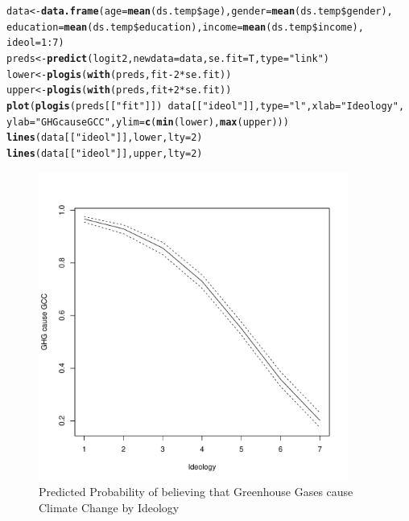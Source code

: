 \documentclass[11pt,openany]{book}\usepackage[]{graphicx}\usepackage[]{color}
\makeatletter
\newcommand{\hlnum}[1]{\textcolor[rgb]{0.686,0.059,0.569}{#1}}%
\newcommand{\hlstr}[1]{\textcolor[rgb]{0.192,0.494,0.8}{#1}}%
\newcommand{\hlopt}[1]{\textcolor[rgb]{0,0,0}{#1}}%
\newcommand{\hlstd}[1]{\textcolor[rgb]{0.345,0.345,0.345}{#1}}%
\newcommand{\hlkwb}[1]{\textcolor[rgb]{0.69,0.353,0.396}{#1}}%
\newcommand{\hlkwc}[1]{\textcolor[rgb]{0.333,0.667,0.333}{#1}}%
\newcommand{\hlkwd}[1]{\textcolor[rgb]{0.737,0.353,0.396}{\textbf{#1}}}%
\newenvironment{kframe}{%
 \def\at@end@of@kframe{}%
 \ifinner\ifhmode%
  \def\at@end@of@kframe{\end{minipage}}%
  \begin{minipage}{\columnwidth}%
 \fi\fi%
 \def\FrameCommand##1{\hskip\@totalleftmargin \hskip-\fboxsep
 \colorbox{shadecolor}{##1}\hskip-\fboxsep
     \hskip-\linewidth \hskip-\@totalleftmargin \hskip\columnwidth}%
 \MakeFramed {\advance\hsize-\width
   \@totalleftmargin\z@ \linewidth\hsize
   \@setminipage}}%
 {\par\unskip\endMakeFramed%
 \at@end@of@kframe}
\newenvironment{knitrout}{}{} %
\renewenvironment{knitrout}{\begin{singlespace}}{\end{singlespace}}
\makeatother
\begin{document}
\begin{knitrout}
\color{fgcolor}\begin{kframe}
\begin{alltt}
\hlstd{data} \hlkwb{<-} \hlkwd{data.frame}\hlstd{(}\hlkwc{age} \hlstd{=} \hlkwd{mean}\hlstd{(ds.temp}\hlopt{\$}\hlstd{age),} \hlkwc{gender} \hlstd{=} \hlkwd{mean}\hlstd{(ds.temp}\hlopt{\$}\hlstd{gender),}
    \hlkwc{education} \hlstd{=} \hlkwd{mean}\hlstd{(ds.temp}\hlopt{\$}\hlstd{education),} \hlkwc{income} \hlstd{=} \hlkwd{mean}\hlstd{(ds.temp}\hlopt{\$}\hlstd{income),}
    \hlkwc{ideol} \hlstd{=} \hlnum{1}\hlopt{:}\hlnum{7}\hlstd{)}
\hlstd{preds} \hlkwb{<-} \hlkwd{predict}\hlstd{(logit2,} \hlkwc{newdata} \hlstd{= data,} \hlkwc{se.fit} \hlstd{= T,} \hlkwc{type} \hlstd{=} \hlstr{"link"}\hlstd{)}
\hlstd{lower} \hlkwb{<-} \hlkwd{plogis}\hlstd{(}\hlkwd{with}\hlstd{(preds, fit} \hlopt{-} \hlnum{2} \hlopt{*} \hlstd{se.fit))}
\hlstd{upper} \hlkwb{<-} \hlkwd{plogis}\hlstd{(}\hlkwd{with}\hlstd{(preds, fit} \hlopt{+} \hlnum{2} \hlopt{*} \hlstd{se.fit))}
\hlkwd{plot}\hlstd{(}\hlkwd{plogis}\hlstd{(preds[[}\hlstr{"fit"}\hlstd{]])} \hlopt{~} \hlstd{data[[}\hlstr{"ideol"}\hlstd{]],} \hlkwc{type} \hlstd{=} \hlstr{"l"}\hlstd{,} \hlkwc{xlab} \hlstd{=} \hlstr{"Ideology"}\hlstd{,}
    \hlkwc{ylab} \hlstd{=} \hlstr{"GHG cause GCC"}\hlstd{,} \hlkwc{ylim} \hlstd{=} \hlkwd{c}\hlstd{(}\hlkwd{min}\hlstd{(lower),} \hlkwd{max}\hlstd{(upper)))}
\hlkwd{lines}\hlstd{(data[[}\hlstr{"ideol"}\hlstd{]], lower,} \hlkwc{lty} \hlstd{=} \hlnum{2}\hlstd{)}
\hlkwd{lines}\hlstd{(data[[}\hlstr{"ideol"}\hlstd{]], upper,} \hlkwc{lty} \hlstd{=} \hlnum{2}\hlstd{)}
\end{alltt}
\end{kframe}
\end{knitrout}
\begin{figure}
        \centering
        \includegraphics[width=4in]{16_Logit/logitplot.pdf}%
        \caption{Predicted Probability of believing that Greenhouse
          Gases cause Climate Change by Ideology \label{fig:logitplot}}
\end{figure}   
			                  
\end{document}
